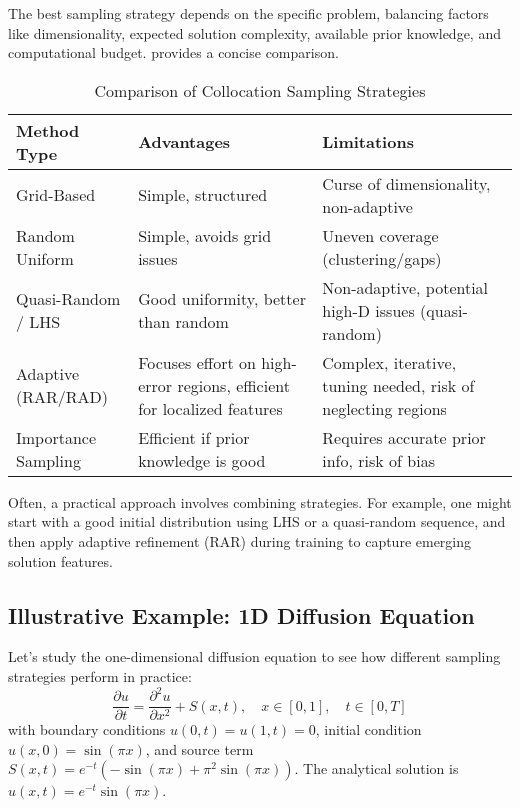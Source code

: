 The best sampling strategy depends on the specific problem, balancing factors like dimensionality, expected solution complexity, available prior knowledge, and computational budget.  provides a concise comparison.
{
\renewcommand{\arraystretch}{1.5}
\begin{table}[htbp] %
    \centering
    \caption{Comparison of Collocation Sampling Strategies}
    \label{tab:sampling_comparison} %
    \begin{tabular}{p{} p{} p{}}
        \toprule
        \textbf{Method Type} & \textbf{Advantages} & \textbf{Limitations} \\ \midrule
        Grid-Based & Simple, structured & Curse of dimensionality, non-adaptive \\
        Random Uniform & Simple, avoids grid issues & Uneven coverage (clustering/gaps) \\
        Quasi-Random / LHS & Good uniformity, better than random & Non-adaptive, potential high-D issues (quasi-random) \\
        Adaptive (RAR/RAD) & Focuses effort on high-error regions, efficient for localized features & Complex, iterative, tuning needed, risk of neglecting regions \\
        Importance Sampling & Efficient if prior knowledge is good & Requires accurate prior info, risk of bias \\
        \bottomrule
    \end{tabular}
\end{table}
}

Often, a practical approach involves combining strategies. For example, one might start with a good initial distribution using LHS or a quasi-random sequence, and then apply adaptive refinement (RAR) during training to capture emerging solution features.

\subsection{Illustrative Example: 1D Diffusion Equation}

Let's study the one-dimensional diffusion equation to see how different sampling strategies perform in practice:
%
\begin{equation*}
    \frac{\partial u}{\partial t} = \frac{\partial^2 u}{\partial x^2} + S(x,t), \quad x \in [0,1], \quad t \in [0,T]
\end{equation*}
%
with boundary conditions $u(0, t) = u(1, t) = 0$, initial condition $u(x, 0) = \sin(\pi x)$, and source term $S(x,t) = e^{-t}(-\sin(\pi x) + \pi^2\sin(\pi x))$. The analytical solution is $u(x, t) = e^{-t} \sin(\pi x)$.

